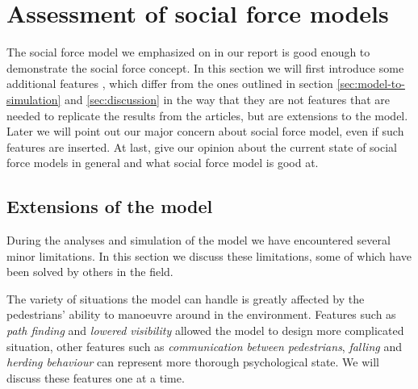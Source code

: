 \section{Assessment of social force models}
\label{sec:assessment}


The social force model we emphasized on in our report is good enough to demonstrate 
the social force concept. In this section we will first introduce some additional features 
, which differ from the ones outlined in section \ref{sec:model-to-simulation} and 
\ref{sec:discussion} in the way that they are not features that are needed to 
replicate the results from the articles, but are extensions to the model.
Later we will point out our major concern about social force model, even if 
such features are inserted. At last, give our opinion about the current state of 
social force models in general and what social force model is good at.

\subsection{Extensions of the model}
During the analyses and simulation of the model we have encountered 
several minor limitations. In this section we discuss these limitations, 
some of which have been solved by others in the field. 

The variety of situations the model can handle is greatly affected by the 
pedestrians' ability to manoeuvre around in the environment. 
Features such as 
\emph{path finding} and \emph{lowered visibility} allowed the model to design 
more complicated situation, other features such as \emph{communication 
between pedestrians}, \emph{falling} and \emph{herding behaviour} can represent 
more thorough psychological state. We will discuss these features one at a time.

